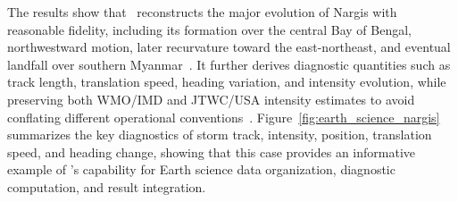 The results show that \ProjectName~reconstructs the major evolution of Nargis with reasonable fidelity, including its formation over the central Bay of Bengal, northwestward motion, later recurvature toward the east-northeast, and eventual landfall over southern Myanmar~\cite{jtwc2008atcr}. It further derives diagnostic quantities such as track length, translation speed, heading variation, and intensity evolution, while preserving both WMO/IMD and JTWC/USA intensity estimates to avoid conflating different operational conventions~\cite{ibtracs2025columns}. Figure~\ref{fig:earth_science_nargis} summarizes the key diagnostics of storm track, intensity, position, translation speed, and heading change, showing that this case provides an informative example of \ProjectName's capability for Earth science data organization, diagnostic computation, and result integration.
